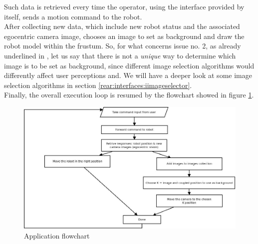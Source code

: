 Such data is retrieved every time the operator, using the 
interface provided by \framework{} itself, sends a 
motion command to the robot.
\\
After collecting new data, which include new robot status and
the associated egocentric camera image, \framework{} chooses 
an image to set as background and draw the robot model within 
the frustum. So, for what concerns issue no. 2, as already 
underlined in \cite{sugimoto}, let us say that there is not 
a \textit{unique} way to determine which image is to be set 
as background, since different image selection algorithms 
would differently affect user perceptions and. We will have a 
deeper look at some image selection algorithms in section
\ref{rear:interfaces:iimageselector}.
\\
Finally, the overall execution loop is resumed by the flowchart 
showed in figure \ref{fig:overall_diagram}.
\\
\begin{figure}[!h]
  \begin{center}
    \includegraphics[width=\textwidth]{img/overall_diagram.jpeg}  %
    \caption{Application flowchart}
    \label{fig:overall_diagram}
  \end{center}
\end{figure}

\newpage

\newpage

\newpage

